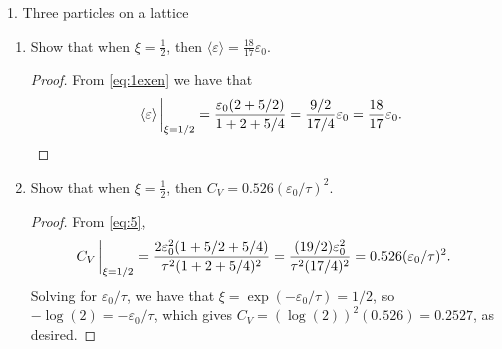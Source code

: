 \documentclass[11pt]{article}
\begin{document}
\begin{problem}{1. Three particles on a lattice}
\begin{enumerate}[label=(\alph*)]
\begin{answer}
\begin{equation}
\begin{aligned}
                &= \frac{4\varepsilon_{0}(1 + 5\xi + 5\xi^2)}{(1+4\xi + 5\xi^2)^2} (\frac{\varepsilon_{0}}{\tau^2}\exp(-\varepsilon_0/\tau)) \\[1.5ex]
                &= \frac{4\varepsilon_{0}^2\xi ( 1 + 5\xi + 5\xi^2 )}{\tau^2(1 + 4\xi + 5\xi^2)^2}.
          \end{aligned}
          \end{equation}
        \end{answer}
  \item Show that when \(\xi = \frac{1}{2}\), then \( \langle \varepsilon \rangle = \frac{18}{17}\varepsilon_0 \).
        \begin{proof}
          From \cref{eq:1exen} we have that
          \begin{equation}
          \label{eq:7}
          \langle \varepsilon \rangle\eval_{\xi=1/2} = \frac{\varepsilon_{0}(2+5/2)}{1 + 2 + 5/4} = \frac{9/2}{17/4}\varepsilon_0 = \frac{18}{17}\varepsilon_0.
          \end{equation}
        \end{proof}
  \item Show that when \(\xi = \frac{1}{2}\), then \( C_V = 0.526(\varepsilon_0/\tau)^2\).

        \begin{proof}
          From \cref{eq:5},
          \begin{equation}
          \label{eq:6}
          \begin{aligned}
            C_V \eval_{\xi = 1/2} &= \frac{2\varepsilon_0^2 (1 + 5/2 + 5/4)}{\tau^2(1 + 2 + 5/4)^2} = \frac{(19/2) \varepsilon_{0}^2}{\tau^2(17/4)^2} = 0.526(\varepsilon_0/\tau)^2.
          \end{aligned}
          \end{equation}
          Solving for \(\varepsilon_{0}/\tau\), we have that \( \xi = \exp(-\varepsilon_0/\tau) = 1/2 \), so \( -\log(2) = -\varepsilon_0/\tau \), which gives \( C_V = (\log(2))^2(0.526) = 0.2527 \), as desired.
        \end{proof}
\end{enumerate}
\end{problem}
\end{document}
